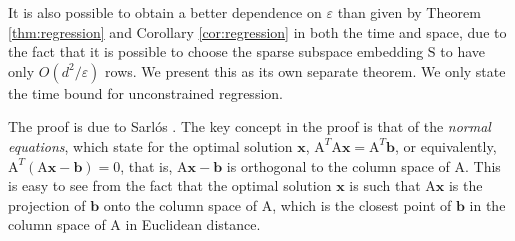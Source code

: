 \documentclass[11pt]{article}
\newcommand{\mat}[1]{{\ensuremath{\bm{\mathrm{#1}}}}}
\def\b{{\mathbf b}}
\def\matA{\mat{A}}
\def\matS{\mat{S}}
\def\x{{\mathbf x}}
\def\b{{\mathbf b}}
\newcommand{\eps}{\varepsilon}
\begin{document}
It is also possible to obtain a better dependence on $\eps$ than given by Theorem \ref{thm:regression} 
and Corollary \ref{cor:regression} in both the time and space, due to the fact that it is 
possible to choose the sparse subspace embedding
$\matS$ to have only $O(d^2/\eps)$ rows. We present this as its own separate theorem. We only state the time bound
for unconstrained regression. 

The proof is due to Sarl\'{o}s \cite{S06}. The key concept in the proof is that of the {\it normal equations}, which state
for the optimal solution $\x$, $\matA^T\matA\x = \matA^T\b$, or equivalently, $\matA^T(\matA \x - \b) = \mat0$, that is,
$\matA \x -\b$ is orthogonal to the column space of $\matA$. This is easy to see from the fact that the optimal
solution $\x$ is such that $\matA \x$ is the projection of $\b$ onto the column space of $\matA$, which is the closest
point of $\b$ in the column space of $\matA$ in Euclidean distance. 
\end{document}
